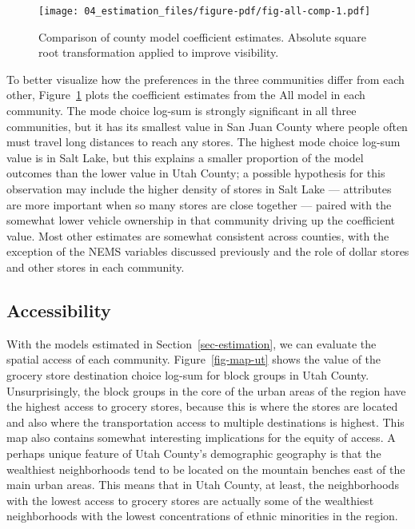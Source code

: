 \documentclass[
  letterpaper,
  authoryear,
  review,
  3p]{elsarticle}
\begin{document}
\begin{figure}

{\centering \texttt{[image: 04\_estimation\_files/figure-pdf/fig-all-comp-1.pdf]}

}

\caption{\label{fig-all-comp}Comparison of county model coefficient
estimates. Absolute square root transformation applied to improve
visibility.}

\end{figure}

To better visualize how the preferences in the three communities differ
from each other, Figure~\ref{fig-all-comp} plots the coefficient
estimates from the All model in each community. The mode choice log-sum
is strongly significant in all three communities, but it has its
smallest value in San Juan County where people often must travel long
distances to reach any stores. The highest mode choice log-sum value is
in Salt Lake, but this explains a smaller proportion of the model
outcomes than the lower value in Utah County; a possible hypothesis for
this observation may include the higher density of stores in Salt Lake
--- attributes are more important when so many stores are close together
--- paired with the somewhat lower vehicle ownership in that community
driving up the coefficient value. Most other estimates are somewhat
consistent across counties, with the exception of the NEMS variables
discussed previously and the role of dollar stores and other stores in
each community.

\hypertarget{sec-access}{%
\subsection{Accessibility}\label{sec-access}}

With the models estimated in Section~\ref{sec-estimation}, we can
evaluate the spatial access of each community. Figure~\ref{fig-map-ut}
shows the value of the grocery store destination choice log-sum for
block groups in Utah County. Unsurprisingly, the block groups in the
core of the urban areas of the region have the highest access to grocery
stores, because this is where the stores are located and also where the
transportation access to multiple destinations is highest. This map also
contains somewhat interesting implications for the equity of access. A
perhaps unique feature of Utah County's demographic geography is that
the wealthiest neighborhoods tend to be located on the mountain benches
east of the main urban areas. This means that in Utah County, at least,
the neighborhoods with the lowest access to grocery stores are actually
some of the wealthiest neighborhoods with the lowest concentrations of
ethnic minorities in the region.
\end{document}
